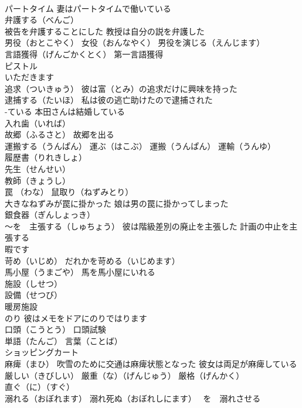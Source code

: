 \documentclass[8pt]{extreport}
\begin{document}
\begin{CJK}{UTF8}{min}
\\	パートタイム 妻はパートタイムで働いている
\\	弁護する（べんご） 
\\	被告を弁護することにした 教授は自分の説を弁護した
\\	男役（おとこやく） 女役（おんなやく） 男役を演じる（えんじます）
\\	言語獲得（げんごかくとく） 第一言語獲得
\\	ピストル
\\	いただきます
\\	追求（ついきゅう） 彼は富（とみ）の追求だけに興味を持った
\\	逮捕する（たいほ） 私は彼の逃亡助けたので逮捕された
\\	-ている 本田さんは結婚している
\\	入れ歯（いれば）
\\	故郷（ふるさと） 故郷を出る
\\	運搬する（うんぱん） 運ぶ（はこぶ） 運搬（うんぱん） 運輸（うんゆ）
\\	履歴書（りれきしょ）
\\	先生（せんせい）
\\	教師（きょうし）
\\	罠 （わな） 鼠取り（ねずみとり）
\\	大きなねずみが罠に掛かった 娘は男の罠に掛かってしまった
\\	銀食器（ぎんしょっき）
\\	～を　主張する（しゅちょう） 彼は階級差別の廃止を主張した 計画の中止を主張する
\\	暇です
\\	苛め（いじめ） だれかを苛める（いじめます）
\\	馬小屋（うまごや） 馬を馬小屋にいれる
\\	施設（しせつ）
\\	設備（せつび）
\\	暖房施設
\\	のり 彼はメモをドアにのりではります
\\	口頭（こうとう） 口頭試験
\\	単語（たんご） 言葉（ことば）
\\	ショッピングカート
\\	麻痺（まひ） 吹雪のために交通は麻痺状態となった 彼女は両足が麻痺している
\\	厳しい（きびしい） 厳重（な）（げんじゅう） 厳格（げんかく） 
\\	直ぐ（に）（すぐ）
\\	溺れる（おぼれます） 溺れ死ぬ（おぼれしにます） ~を　溺れさせる

\end{CJK}
\end{document}
